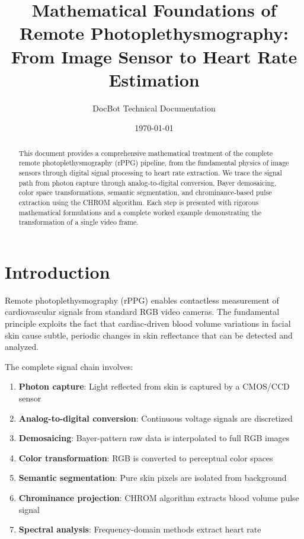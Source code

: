 \documentclass[11pt,a4paper]{article}
\title{\textbf{Mathematical Foundations of Remote Photoplethysmography:\\
From Image Sensor to Heart Rate Estimation}}
\author{DocBot Technical Documentation}
\date{\today}
\begin{document}
\maketitle

\begin{abstract}
This document provides a comprehensive mathematical treatment of the complete remote photoplethysmography (rPPG) pipeline, from the fundamental physics of image sensors through digital signal processing to heart rate extraction. We trace the signal path from photon capture through analog-to-digital conversion, Bayer demosaicing, color space transformations, semantic segmentation, and chrominance-based pulse extraction using the CHROM algorithm. Each step is presented with rigorous mathematical formulations and a complete worked example demonstrating the transformation of a single video frame.
\end{abstract}

\tableofcontents
\newpage

\section{Introduction}

Remote photoplethysmography (rPPG) enables contactless measurement of cardiovascular signals from standard RGB video cameras. The fundamental principle exploits the fact that cardiac-driven blood volume variations in facial skin cause subtle, periodic changes in skin reflectance that can be detected and analyzed.

The complete signal chain involves:
\begin{enumerate}
    \item \textbf{Photon capture}: Light reflected from skin is captured by a CMOS/CCD sensor
    \item \textbf{Analog-to-digital conversion}: Continuous voltage signals are discretized
    \item \textbf{Demosaicing}: Bayer-pattern raw data is interpolated to full RGB images
    \item \textbf{Color transformation}: RGB is converted to perceptual color spaces
    \item \textbf{Semantic segmentation}: Pure skin pixels are isolated from background
    \item \textbf{Chrominance projection}: CHROM algorithm extracts blood volume pulse signal
    \item \textbf{Spectral analysis}: Frequency-domain methods extract heart rate
\end{enumerate}
\end{document}
